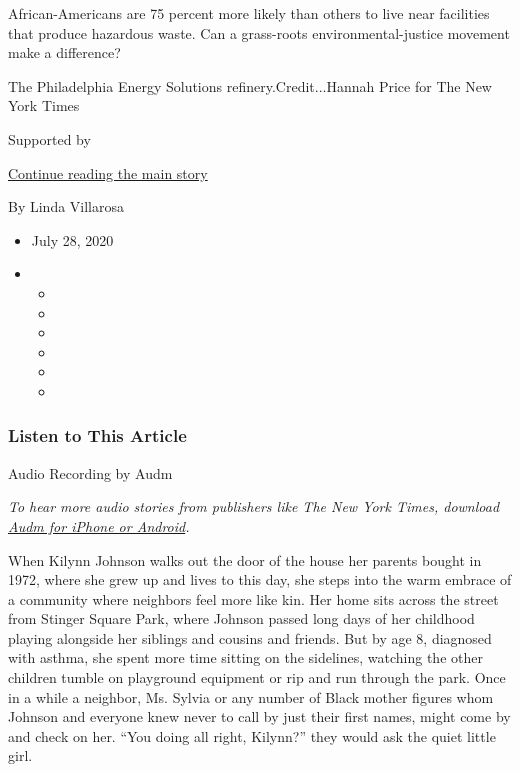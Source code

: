African-Americans are 75 percent more likely than others to live near
facilities that produce hazardous waste. Can a grass-roots
environmental-justice movement make a difference?

The Philadelphia Energy Solutions refinery.Credit...Hannah Price for The
New York Times

Supported by

\protect\hyperlink{after-sponsor}{Continue reading the main story}

By Linda Villarosa

\begin{itemize}
\item
  July 28, 2020
\item
  \begin{itemize}
  \item
  \item
  \item
  \item
  \item
  \item
  \end{itemize}
\end{itemize}

\hypertarget{listen-to-this-article}{%
\subsubsection{Listen to This Article}\label{listen-to-this-article}}

Audio Recording by Audm

\emph{To hear more audio stories from publishers like The New York
Times, download}
\emph{\href{https://www.audm.com/?utm_source=nytmag\&utm_medium=embed\&utm_campaign=refinery_next_door\%09\%09\%09\%09\%09\%09https://www.audm.com/?utm_source=nytmag\&utm_medium=embed\&utm_campaign=refinery_next_door}{Audm
for iPhone or Android}.}

When Kilynn Johnson walks out the door of the house her parents bought
in 1972, where she grew up and lives to this day, she steps into the
warm embrace of a community where neighbors feel more like kin. Her home
sits across the street from Stinger Square Park, where Johnson passed
long days of her childhood playing alongside her siblings and cousins
and friends. But by age 8, diagnosed with asthma, she spent more time
sitting on the sidelines, watching the other children tumble on
playground equipment or rip and run through the park. Once in a while a
neighbor, Ms. Sylvia or any number of Black mother figures whom Johnson
and everyone knew never to call by just their first names, might come by
and check on her. ``You doing all right, Kilynn?'' they would ask the
quiet little girl.

